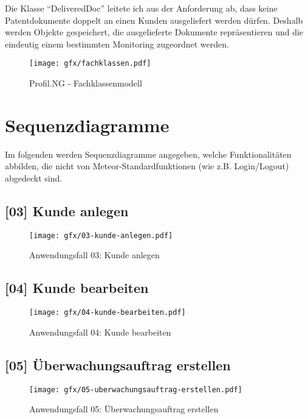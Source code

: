 Die Klasse "`DeliveredDoc"' leitete ich aus der Anforderung ab, dass keine
Patentdokumente doppelt an einen Kunden ausgeliefert werden dürfen. Deshalb
werden Objekte gespeichert, die ausgelieferte Dokumente repräsentieren und die
eindeutig einem bestimmten Monitoring zugeordnet werden.

\begin{figure}[H]
  \texttt{[image: gfx/fachklassen.pdf]}
  \caption{Profil.NG - Fachklassenmodell}
  \label{fig:PNGFachklassen}
\end{figure}

\section{Sequenzdiagramme}

Im folgenden werden Sequenzdiagramme angegeben, welche Funktionalitäten abbilden,
die nicht von Meteor-Standardfunktionen (wie z.B. Login/Logout) abgedeckt sind.

\subsection{[03] Kunde anlegen}
\label{ch:SystemEntwurf:03}

\begin{figure}[H]
  \texttt{[image: gfx/03-kunde-anlegen.pdf]}
  \caption{Anwendungsfall 03: Kunde anlegen}
  \label{fig:AF03}
\end{figure}

\subsection{[04] Kunde bearbeiten}
\label{ch:SystemEntwurf:04}

\begin{figure}[H]
  \texttt{[image: gfx/04-kunde-bearbeiten.pdf]}
  \caption{Anwendungsfall 04: Kunde bearbeiten}
  \label{fig:AF04}
\end{figure}

\subsection{[05] Überwachungsauftrag erstellen}
\label{ch:SystemEntwurf:05}

\begin{figure}[H]
  \texttt{[image: gfx/05-uberwachungsauftrag-erstellen.pdf]}
  \caption{Anwendungsfall 05: Überwachungsauftrag erstellen}
  \label{fig:AF05}
\end{figure}

